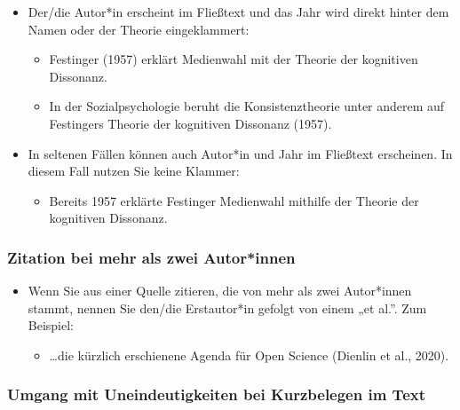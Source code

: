 \documentclass[
  letterpaper,
  DIV=11]{scrreprt}
\providecommand{\tightlist}{%
  \setlength{\itemsep}{0pt}\setlength{\parskip}{0pt}}\usepackage{longtable,booktabs,array}
\begin{document}
\begin{itemize}
\item
  Der/die Autor*in erscheint im Fließtext und das Jahr wird direkt
  hinter dem Namen oder der Theorie eingeklammert:

  \begin{itemize}
  \item
    Festinger (1957) erklärt Medienwahl mit der Theorie der kognitiven
    Dissonanz.
  \item
    In der Sozialpsychologie beruht die Konsistenztheorie unter anderem
    auf Festingers Theorie der kognitiven Dissonanz (1957).
  \end{itemize}
\item
  In seltenen Fällen können auch Autor*in und Jahr im Fließtext
  erscheinen. In diesem Fall nutzen Sie keine Klammer:

  \begin{itemize}
  \tightlist
  \item
    Bereits 1957 erklärte Festinger Medienwahl mithilfe der Theorie der
    kognitiven Dissonanz.
  \end{itemize}
\end{itemize}

\subsubsection{Zitation bei mehr als zwei
Autor*innen}\label{zitation-bei-mehr-als-zwei-autorinnen}

\begin{itemize}
\item
  Wenn Sie aus einer Quelle zitieren, die von mehr als zwei Autor*innen
  stammt, nennen Sie den/die Erstautor*in gefolgt von einem „et al.''.
  Zum Beispiel:

  \begin{itemize}
  \tightlist
  \item
    \ldots die kürzlich erschienene Agenda für Open Science (Dienlin et
    al., 2020).
  \end{itemize}
\end{itemize}

\subsubsection{Umgang mit Uneindeutigkeiten bei Kurzbelegen im
Text}\label{umgang-mit-uneindeutigkeiten-bei-kurzbelegen-im-text}
\end{document}

